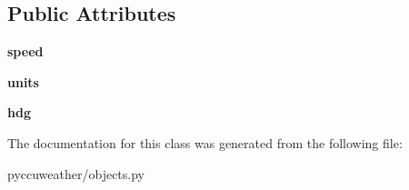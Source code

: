 \subsection*{Public Attributes}
\begin{DoxyCompactItemize}
\item 
\hypertarget{classpyccuweather_1_1objects_1_1_wind_aa3b836245385c31cbd94a9c5be8a4cfd}{}{\bfseries speed}\label{classpyccuweather_1_1objects_1_1_wind_aa3b836245385c31cbd94a9c5be8a4cfd}

\item 
\hypertarget{classpyccuweather_1_1objects_1_1_wind_aaeb472949e84e3dea1f1267c490ff49f}{}{\bfseries units}\label{classpyccuweather_1_1objects_1_1_wind_aaeb472949e84e3dea1f1267c490ff49f}

\item 
\hypertarget{classpyccuweather_1_1objects_1_1_wind_a751506b75edac12a8bcc7965083f5aec}{}{\bfseries hdg}\label{classpyccuweather_1_1objects_1_1_wind_a751506b75edac12a8bcc7965083f5aec}

\end{DoxyCompactItemize}


The documentation for this class was generated from the following file\+:\begin{DoxyCompactItemize}
\item 
pyccuweather/objects.\+py\end{DoxyCompactItemize}
